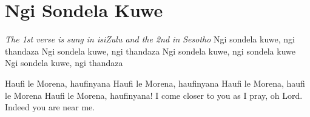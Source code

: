 \starttocol
\chapter{Ngi Sondela Kuwe}
\nexttocol
\hfill{\it The 1st verse is sung in isiZulu and the 2nd in Sesotho}
\stoptocol
\starttocol
\startlines
{\sc Ngi} sondela kuwe, ngi thandaza
Ngi sondela kuwe, ngi thandaza
Ngi sondela kuwe, ngi sondela kuwe
Ngi sondela kuwe, ngi thandaza

Haufi le Morena, haufinyana
Haufi le Morena, haufinyana
Haufi le Morena, haufi le Morena
Haufi le Morena, haufinyana!
\stoplines
\nexttocol
I come closer to you as I pray, oh Lord. Indeed you are near me.
\stoptocol
